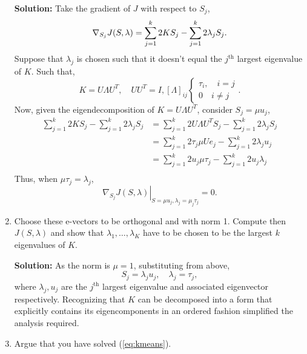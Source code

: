\documentclass{article}[12pt]
\begin{document}
\begin{enumerate}
\textbf{Solution: } Take the gradient of $J$ with respect to $S_j$, 
	 \begin{equation}
	\nabla_{S_j} J(S, \lambda) = \sum^{k}_{j=1} 2K S_j - \sum^{k}_{j=1} 2 \lambda_j S_j.  \\
\end{equation}
Suppose that $\lambda_j$ is chosen such that it doesn't equal the $j^\text{th}$ largest eigenvalue of $K$. Such that,
	 \begin{equation}
		 K=U \Lambda U^T, \quad UU^T=I, [\Lambda]_{ij} \begin{cases} \tau_i, \quad i=j \\ 0 \quad i \ne j  \end{cases}.
	 \end{equation}
Now, given the eigendecomposition of $K=U\Lambda U^T$, consider $S_j = \mu u_j$,
\begin{equation}
\begin{aligned}
	\sum^{k}_{j=1} 2 K S_j - \sum^{k}_{j=1} 2 \lambda_j S_j &= \sum^{k}_{j=1} 2 U \Lambda U^T S_j - \sum^{k}_{j=1} 2 \lambda_j S_j \\
								&= \sum^{k}_{j=1} 2 \tau_j \mu  U e_j - \sum^{k}_{j=1} 2 \lambda_j u_j \\
								&= \sum^{k}_{j=1} 2 u_j \mu \tau_j - \sum^{k}_{j=1} 2 u_j \lambda_j \\
\end{aligned}
\end{equation}
Thus, when $\mu \tau_j = \lambda_j$,
\begin{equation}
	\left. \nabla_{S_j }J(S, \lambda)\right|_{S=\mu u_j, \lambda_j = \mu_j \tau_j }= 0.
\end{equation}

 \item Choose these e-vectors to be orthogonal and with norm 1. Compute then $J(S,\lambda)$ and show that $\lambda_1,\ldots,\lambda_K$ have to be chosen to be the largest $k$ eigenvalues of $K$.

	 \textbf{Solution:} As the norm is $\mu=1$, substituting from above,
	 \begin{equation}
	 	S_j = \lambda_j u_j, \quad \lambda_j = \tau_j,
	 \end{equation} 
	 where $\lambda_j, u_j$ are the $j^\text{th}$ largest eigenvalue and associated eigenvector respectively. Recognizing that $K$ can be decomposed into a form that explicitly contains its eigencomponents in an ordered fashion simplified the analysis required. 


 \item Argue that you have solved (\ref{eq:kmeans}). 
 

\end{enumerate}
\end{document}
